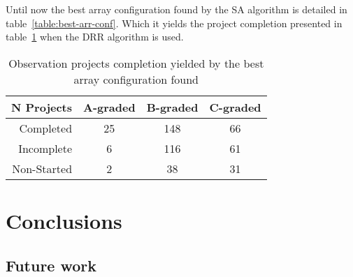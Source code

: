 Until now the best array configuration found by the SA algorithm is detailed in table~\ref{table:best-arr-conf}. Which it yields the project completion presented in table~\ref{table:best-solution-found} when the DRR algorithm is used.

\begin{table}[htbp]
\centering
\begin{tabular}{|r|c|c|c|} \hline
 N Projects & A-graded & B-graded & C-graded \\ \hline
 Completed & 25 & 148 & 66 \\ \hline
 Incomplete & 6 & 116 & 61 \\ \hline
 Non-Started & 2 & 38 & 31 \\ \hline
\end{tabular}
\caption{Observation projects completion yielded by the best array configuration found}
\label{table:best-solution-found}
\end{table}

\chapter{Conclusions}

\section{Future work}